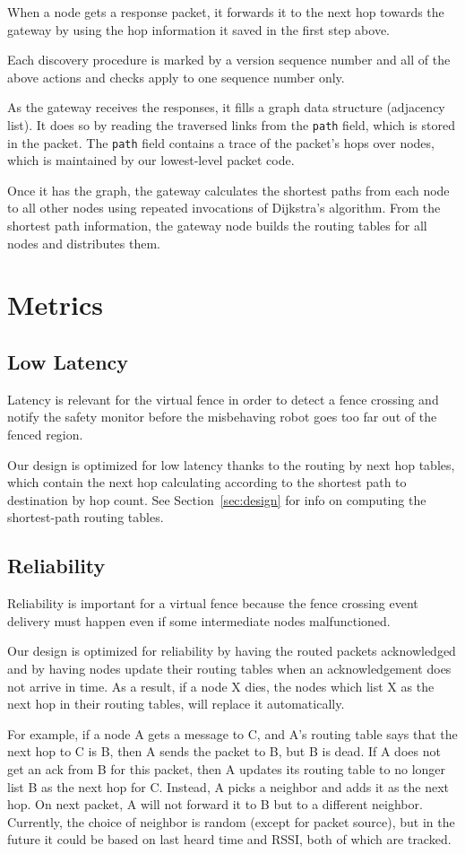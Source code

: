 \documentclass{article}
\begin{document}
When a node gets a response packet, it forwards it to the next
hop towards the gateway by using the hop information it saved
in the first step above.

Each discovery procedure is marked by a version sequence number and all of the
above actions and checks apply to one sequence number only.

As the gateway receives the responses, it fills a graph data structure
(adjacency list). It does so by reading the traversed links from the
\texttt{path} field, which is stored in the packet. The \texttt{path} field
contains a trace of the packet's hops over nodes, which is maintained by our
lowest-level packet code.

Once it has the graph, the gateway calculates the shortest paths from each node
to all other nodes using repeated invocations of Dijkstra's algorithm. From the
shortest path information, the gateway node builds the routing tables for all
nodes and distributes them.

\section{Metrics}

\subsection{Low Latency}

Latency is relevant for the virtual fence in order to detect a
fence crossing and notify the safety monitor before the
misbehaving robot goes too far out of the fenced region.

Our design is optimized for low latency thanks to the routing by next hop
tables, which contain the next hop calculating according to the shortest path
to destination by hop count. See Section~\ref{sec:design} for info
on computing the shortest-path routing tables.

\subsection{Reliability}

Reliability is important for a virtual fence because the fence crossing event
delivery must happen even if some intermediate nodes malfunctioned.

Our design is optimized for reliability by having the routed packets
acknowledged and by having nodes update their routing tables when an
acknowledgement does not arrive in time. As a result, if a node X dies, the
nodes which list X as the next hop in their routing tables, will replace it
automatically.

For example, if a node A gets a message to C, and A's routing table says that
the next hop to C is B, then A sends the packet to B, but B is dead. If A does
not get an ack from B for this packet, then A updates its routing table to no
longer list B as the next hop for C. Instead, A picks a neighbor and adds it as
the next hop. On next packet, A will not forward it to B but to a different
neighbor. Currently, the choice of neighbor is random (except for packet
source), but in the future it could be based on last heard time and RSSI, both
of which are tracked.
\end{document}
